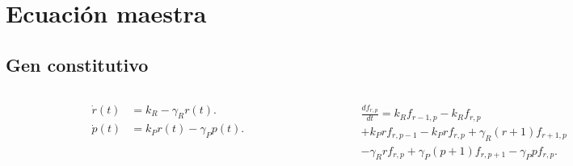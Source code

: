 \documentclass[xcolor=dvipsnames]{beamer}
\begin{document}
\section{Ecuaci\'on maestra}
\subsection{Gen constitutivo}
\begin{frame}
\begin{columns}[c]
\begin{figure}[p]
    \centering
    \includegraphics[width=\textwidth]{mas-dogma}
\end{figure}
\begin{align*}
\dot{r}(t) &= k_R - \gamma_Rr(t).\\
\dot{p}(t) &= k_Pr(t) - \gamma_Pp(t).
\end{align*}
\begin{figure}[p]
    \centering
    \includegraphics[width=\textwidth]{mas-trans_single}\\
\end{figure}
\begin{align*}
&\frac{d{f}_{r,p}}{dt} = k_Rf_{r-1,p} - k_Rf_{r,p}\\
&+ k_Prf_{r,p-1} - k_Prf_{r,p} + \gamma_R(r+1)f_{r+1,p}\\
&- \gamma_Rrf_{r,p} + \gamma_P(p+1)f_{r,p+1} - \gamma_Ppf_{r,p}.
\end{align*}
\end{columns}
\end{frame}
\end{document}
